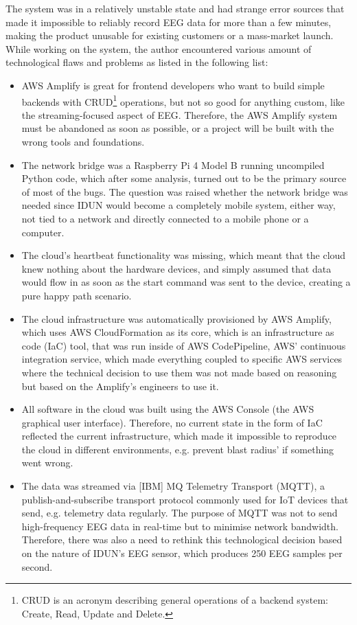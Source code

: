 The system was in a relatively unstable state and had strange error sources that made it impossible to reliably record EEG data for more than a few minutes, making the product unusable for existing customers or a mass-market launch. While working on the system, the author encountered various amount of technological flaws and problems as listed in the following list:

\begin{itemize}

\item AWS Amplify is great for frontend developers who want to build simple backends with CRUD\footnote{CRUD is an acronym describing general operations of a backend system: Create, Read, Update and Delete.} operations, but not so good for anything custom, like the streaming-focused aspect of EEG. Therefore, the AWS Amplify system must be abandoned as soon as possible, or a project will be built with the wrong tools and foundations.
\item The network bridge was a Raspberry Pi 4 Model B running uncompiled Python code, which after some analysis, turned out to be the primary source of most of the bugs. The question was raised whether the network bridge was needed since IDUN would become a completely mobile system, either way, not tied to a network and directly connected to a mobile phone or a computer.
\item The cloud's heartbeat functionality was missing, which meant that the cloud knew nothing about the hardware devices, and simply assumed that data would flow in as soon as the start command was sent to the device, creating a pure happy path scenario.
\item The cloud infrastructure was automatically provisioned by AWS Amplify, which uses AWS CloudFormation as its core, which is an infrastructure as code (IaC) tool, that was run inside of AWS CodePipeline, AWS' continuous integration service, which made everything coupled to specific AWS services where the technical decision to use them was not made based on reasoning but based on the Amplify's engineers to use it.
\item All software in the cloud was built using the AWS Console (the AWS graphical user interface). Therefore, no current state in the form of IaC reflected the current infrastructure, which made it impossible to reproduce the cloud in different environments, e.g. prevent blast radius' if something went wrong.
\item The data was streamed via [IBM] MQ Telemetry Transport (MQTT), a publish-and-subscribe transport protocol commonly used for IoT devices that send, e.g. telemetry data regularly. The purpose of MQTT was not to send high-frequency EEG data in real-time but to minimise network bandwidth. Therefore, there was also a need to rethink this technological decision based on the nature of IDUN's EEG sensor, which produces 250 EEG samples per second.

\end{itemize}
